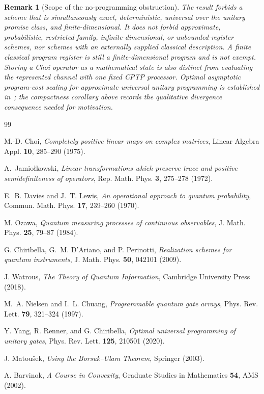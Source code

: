 \documentclass[11pt,a4paper]{article}
\newtheorem{remark}[theorem]{Remark}
\begin{document}
\begin{remark}[Scope of the no-programming obstruction]
\label{rem:scope}
The result forbids a scheme that is simultaneously exact, deterministic, universal over the unitary promise class, and finite-dimensional. It does not forbid approximate, probabilistic, restricted-family, infinite-dimensional, or unbounded-register schemes, nor schemes with an externally supplied classical description. A finite classical program register is still a finite-dimensional program and is not exempt. Storing a Choi operator as a mathematical state is also distinct from evaluating the represented channel with one fixed CPTP processor. Optimal asymptotic program-cost scaling for approximate universal unitary programming is established in~\cite{YangRennerChiribella2020}; the compactness corollary above records the qualitative divergence consequence needed for motivation.
\end{remark}

\begin{thebibliography}{99}

M.-D. Choi, \emph{Completely positive linear maps on complex matrices}, Linear Algebra Appl. \textbf{10}, 285--290 (1975).

A.~Jamio{\l}kowski, \emph{Linear transformations which preserve trace and positive semidefiniteness of operators}, Rep. Math. Phys. \textbf{3}, 275--278 (1972).

E.~B. Davies and J.~T. Lewis, \emph{An operational approach to quantum probability}, Commun. Math. Phys. \textbf{17}, 239--260 (1970).

M. Ozawa, \emph{Quantum measuring processes of continuous observables}, J. Math. Phys. \textbf{25}, 79--87 (1984).

G. Chiribella, G.~M. D'Ariano, and P. Perinotti, \emph{Realization schemes for quantum instruments}, J. Math. Phys. \textbf{50}, 042101 (2009).

J. Watrous, \emph{The Theory of Quantum Information}, Cambridge University Press (2018).

M.~A. Nielsen and I.~L. Chuang, \emph{Programmable quantum gate arrays}, Phys. Rev. Lett. \textbf{79}, 321--324 (1997).

Y. Yang, R. Renner, and G. Chiribella, \emph{Optimal universal programming of unitary gates}, Phys. Rev. Lett. \textbf{125}, 210501 (2020).

J. Matou{\v{s}}ek, \emph{Using the Borsuk--Ulam Theorem}, Springer (2003).

A. Barvinok, \emph{A Course in Convexity}, Graduate Studies in Mathematics \textbf{54}, AMS (2002).

\end{thebibliography}
\end{document}

